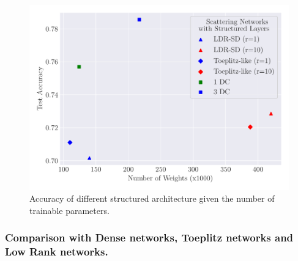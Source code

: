 \begin{figure}
   \centering
   \includegraphics[width=\scalefigure\textwidth]{figures/main/ch4-diagonal_circulant/scatterplot.pdf}
   \caption{Accuracy of different structured architecture given the number of trainable parameters.}
   \label{figure:ch4-cifar10_with_channels_xp}
\end{figure}




\subsubsection{Comparison with Dense networks, Toeplitz networks and Low Rank networks.}

